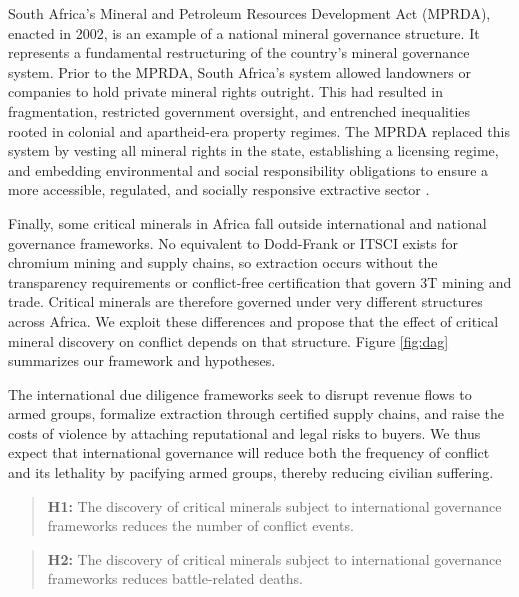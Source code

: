 \documentclass[11pt]{article}
\begin{document}
South Africa's Mineral and Petroleum Resources Development Act (MPRDA), enacted in 2002, is an example of a national mineral governance structure. It represents a fundamental restructuring of the country's mineral governance system. Prior to the MPRDA, South Africa's system allowed landowners or companies to hold private mineral rights outright. This had resulted in fragmentation, restricted government oversight, and entrenched inequalities rooted in colonial and apartheid-era property regimes. The MPRDA replaced this system by vesting all mineral rights in the state, establishing a licensing regime, and embedding environmental and social responsibility obligations to ensure a more accessible, regulated, and socially responsive extractive sector \citep{cawood2004mineral, cawood2004investment}.

Finally, some critical minerals in Africa fall outside international and national governance frameworks. No equivalent to Dodd-Frank or ITSCI exists for chromium mining and supply chains, so extraction occurs without the transparency requirements or conflict-free certification that govern 3T mining and trade. Critical minerals are therefore governed under very different structures across Africa. We exploit these differences and propose that the effect of critical mineral discovery on conflict depends on that structure. Figure \ref{fig:dag} summarizes our framework and hypotheses.


The international due diligence frameworks seek to disrupt revenue flows to armed groups, formalize extraction through certified supply chains, and raise the costs of violence by attaching reputational and legal risks to buyers. We thus expect that international governance will reduce both the frequency of conflict and its lethality by pacifying armed groups, thereby reducing civilian suffering.

\begin{quote}
\textbf{H1:} The discovery of critical minerals subject to international governance frameworks reduces the number of conflict events.
\end{quote}

\begin{quote}
\textbf{H2:} The discovery of critical minerals subject to international governance frameworks reduces battle-related deaths.
\end{quote}
\end{document}
